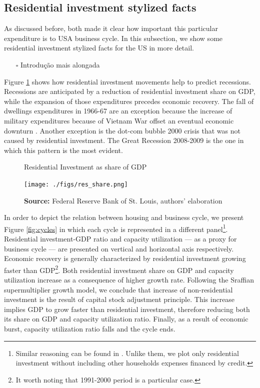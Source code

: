 \documentclass[11pt]{article}
\begin{document}
\subsection{Residential investment stylized facts}
\label{sec:orge4fec7a}

As discussed before, both \textcites{green_follow_1997}{leamer_housing_2007} made it clear how important this particular expenditure is to USA business cycle. In this subsection, we show some residential investment stylized facts for the US in more detail.

\begin{itemize}
\item[{$\square$}] Introdução mais alongada
\end{itemize}

Figure \ref{Investo_Resid_GDP} shows how residential investment movements help to predict recessions. Recessions are anticipated by a reduction of residential investment share on GDP, while the expansion of those expenditures precedes economic recovery. The fall of dwellings expenditures in 1966-67 are an exception because the increase of military expenditures because of Vietnam War offset an eventual economic downturn \cite[p.~20]{leamer_housing_2007}. Another exception is the dot-com bubble 2000 crisis that was not caused by residential investment. The Great Recession 2008-2009 is the one in which this pattern is the most evident. 



\begin{figure}[htb]
    \centering
        \caption{Residential Investment as share of GDP}
        \label{Investo_Resid_GDP}
    \texttt{[image: ./figs/res\_share.png]}
    \caption*{\textbf{Source:} Federal Reserve Bank of St. Louis, authors’ elaboration}
\end{figure}

In order to depict the relation between housing and business cycle, we present Figure \ref{fig:cycles} in which each cycle is represented in a different panel\footnote{Similar reasoning can be found in \textcite{fiebiger_trend_2017}. Unlike them, we plot only residential investment without including other households expenses financed by credit.}.
Residential investment-GDP ratio and capacity utilization --- as a proxy for business cycle --- are presented on vertical and horizontal axis respectively.
Economic recovery is generally characterized by residential investment growing faster than GDP\footnote{It worth noting that 1991-2000 period is a particular case.}. Both residential investment share on GDP and capacity utilization increase as a consequence of higher growth rate.
Following the Sraffian supermultiplier growth model, we conclude that increase of non-residential investment is the result of capital stock adjustment principle. This increase implies GDP to grow faster than residential investment, therefore reducing both its share on GDP and capacity utilization ratio. Finally, as a result of economic burst, capacity utilization ratio falls and the cycle ends.
\end{document}
